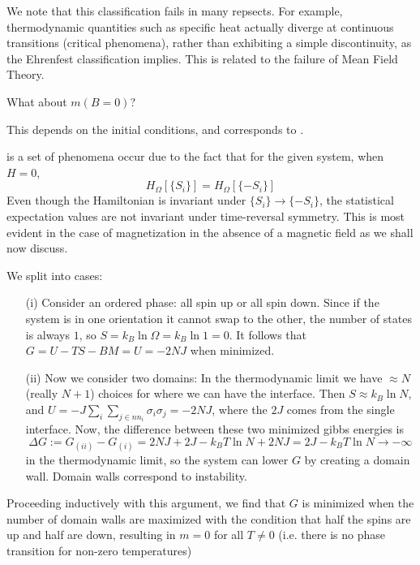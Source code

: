 \documentclass[12pt, a4paper, oneside, openright, titlepage]{book}
\begin{document}
We note that this classification fails in many repsects. For example, thermodynamic quantities such as specific heat actually diverge at continuous transitions (critical phenomena), rather than exhibiting a simple discontinuity, as the Ehrenfest classification implies. This is related to the failure of Mean Field Theory.

\begin{qst}
    What about $m(B=0)$?
\end{qst}

This depends on the initial conditions, and corresponds to .

\begin{defn}
     is a set of phenomena occur due to the fact that for the given system, when $H = 0$, $$H_{\Omega}[\{S_i\}] = H_{\Omega}[\{-S_i\}]$$ Even though the Hamiltonian is invariant under $\{S_i\}\rightarrow \{-S_i\}$, the statistical expectation values are not invariant under time-reversal symmetry. This is most evident in the case of magnetization in the absence of a magnetic field as we shall now discuss.
\end{defn}


\begin{eg}
    We split into cases: \begin{itemize}
        \item[(i)] Consider an ordered phase: all spin up or all spin down. Since if the system is in one orientation it cannot swap to the other, the number of  states is always $1$, so $S = k_B\ln\Omega = k_B\ln 1 = 0$. It follows that $G = U-TS-BM = U = -2NJ$ when minimized.
        \item[(ii)] Now we consider two domains: In the thermodynamic limit we have $\approx N$ (really $N+1$) choices for where we can have the interface. Then $S \approx k_B\ln N$, and $U = -J\sum_i\sum_{j\in nn_i}\sigma_i\sigma_j = -2NJ$, where the $2J$ comes from the single interface. Now, the difference between these two minimized gibbs energies is $$\Delta G := G_{(ii)} - G_{(i)} = 2NJ + 2J - k_BT\ln N + 2NJ = 2J-k_BT\ln N\rightarrow -\infty$$ in the thermodynamic limit, so the system can lower $G$ by creating a domain wall. Domain walls correspond to instability. 
    \end{itemize}
    Proceeding inductively with this argument, we find that $G$ is minimized when the number of domain walls are maximized with the condition that half the spins are up and half are down, resulting in $m = 0$ for all $T \neq 0$ (i.e. there is no phase transition for non-zero temperatures)
\end{eg}
\end{document}
